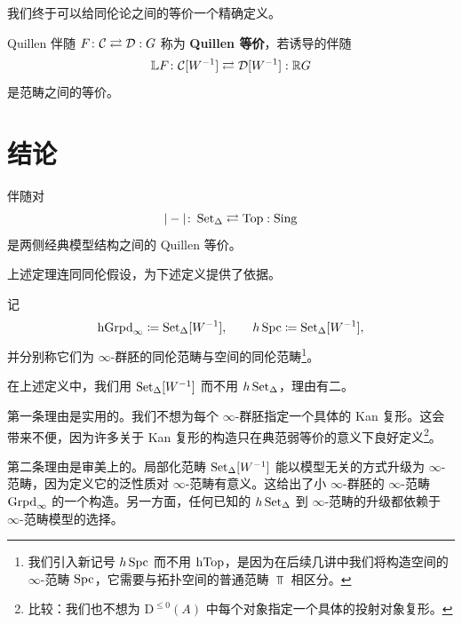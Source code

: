 \nitem\label{L3-7.19}
我们终于可以给同伦论之间的等价一个精确定义。

\begin{definition}\label{L3-7.20}
Quillen 伴随 $F\colon\mathcal{C}\rightleftarrows\mathcal{D}:G$ 称为 \textbf{Quillen 等价}，若诱导的伴随
\[
\mathbb{L}F\colon\mathcal{C}[W^{-1}]\rightleftarrows\mathcal{D}[W^{-1}]:\mathbb{R}G
\]
是范畴之间的等价。
\end{definition}

\section{结论}

\begin{theorem}[Quillen]\label{L3-8.1}
伴随对
\[
|-|\colon\operatorname{Set}_{\Delta}\rightleftarrows\operatorname{Top}:\operatorname{Sing}
\]
是两侧经典模型结构之间的 Quillen 等价。
\end{theorem}

\nitem\label{L3-8.2}
上述定理连同同伦假设，为下述定义提供了依据。

\begin{definition}\label{L3-8.3}
记
\[
\operatorname{hGrpd}_{\infty}\coloneqq\operatorname{Set}_{\Delta}[W^{-1}],\qquad h\operatorname{Spc}\coloneqq\operatorname{Set}_{\Delta}[W^{-1}],
\]
并分别称它们为 $\infty$-群胚的同伦范畴与空间的同伦范畴\footnote{我们引入新记号 $h\operatorname{Spc}$ 而不用 $\operatorname{hTop}$，是因为在后续几讲中我们将构造空间的 $\infty$-范畴 $\operatorname{Spc}$，它需要与拓扑空间的普通范畴 $\Top$ 相区分。}。
\end{definition}


\begin{remark}\label{L3-8.4}
在上述定义中，我们用 $\operatorname{Set}_{\Delta}[W^{-1}]$ 而不用 $h\operatorname{Set}_{\Delta}$，理由有二。

第一条理由是实用的。我们不想为每个 $\infty$-群胚指定一个具体的 Kan 复形。这会带来不便，因为许多关于 Kan 复形的构造只在典范弱等价的意义下良好定义\footnote{比较：我们也不想为 $\mathrm{D}^{\le 0}(A)$ 中每个对象指定一个具体的投射对象复形。}。

第二条理由是审美上的。局部化范畴 $\operatorname{Set}_{\Delta}[W^{-1}]$ 能以模型无关的方式升级为 $\infty$-范畴，因为定义它的泛性质对 $\infty$-范畴有意义。这给出了小 $\infty$-群胚的 $\infty$-范畴 $\operatorname{Grpd}_{\infty}$ 的一个构造。另一方面，任何已知的 $h\operatorname{Set}_{\Delta}$ 到 $\infty$-范畴的升级都依赖于 $\infty$-范畴模型的选择。
\end{remark}

